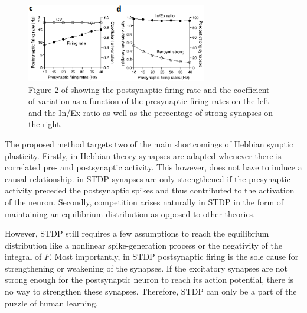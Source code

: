 \begin{figure}[H]
	\centering
	\includegraphics[width=0.7\textwidth]{CN3}
	\caption{Figure 2 of \cite{article} showing the postsynaptic firing rate and the coefficient of variation as a function of the presynaptic firing rates on the left and the In/Ex ratio as well as the percentage of strong synapses on the right.}
	\label{fig:2}
\end{figure}

The proposed method targets two of the main shortcomings of Hebbian synptic plasticity. Firstly, in Hebbian theory synapses are adapted whenever there is correlated pre- and postsynaptic activity. This however, does not have to induce a causal relationship. in STDP synapses are only strengthened if the presynaptic activity preceded the postsynaptic spikes and thus contributed to the activation of the neuron. Secondly, competition arises naturally in STDP in the form of maintaining an equilibrium distribution as opposed to other theories.

However, STDP still requires a few assumptions to reach the equilibrium distribution like a nonlinear spike-generation process or the negativity of the integral of $F$. Most importantly, in STDP postsynaptic firing is the sole cause for strengthening or weakening of the synapses. If the excitatory synapses are not strong enough for the postsynaptic neuron to reach its action potential, there is no way to strengthen these synapses. Therefore, STDP can only be a part of the puzzle of human learning. 